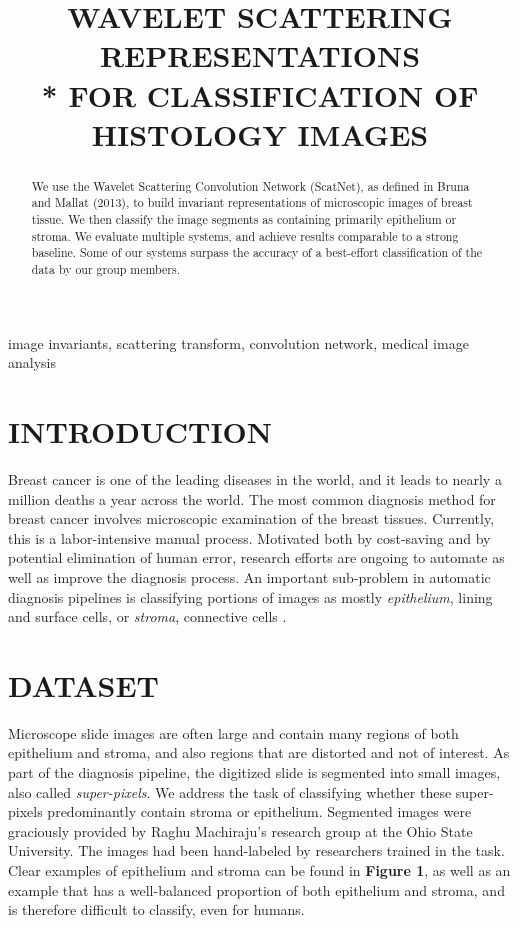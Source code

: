 \documentclass{article}
\title{WAVELET SCATTERING REPRESENTATIONS \\*
FOR CLASSIFICATION OF HISTOLOGY IMAGES}
\begin{document}
%
\maketitle
%
\begin{abstract}
We use the Wavelet Scattering Convolution Network (ScatNet), as defined in Bruna
and Mallat (2013), to build invariant representations of microscopic images of breast
tissue. We then classify the image segments as containing primarily epithelium or stroma.
We evaluate multiple systems, and achieve results comparable to a strong baseline. Some
of our systems surpass the accuracy of a best-effort classification of the data by our
group members.
\end{abstract}
%
\begin{keywords}
image invariants, scattering transform, convolution network, medical image analysis
\end{keywords}
%
\section{INTRODUCTION}
\label{sec:intro}

Breast cancer is one of the leading diseases in the world, and it leads to nearly a
million deaths a year across the world. The most common diagnosis method for breast
cancer involves microscopic examination of the breast tissues. Currently, this is a
labor-intensive manual process. Motivated both by cost-saving and by potential
elimination of human error, research efforts are ongoing to automate as well as improve
the diagnosis process. An important sub-problem in automatic diagnosis pipelines is
classifying portions of images as mostly \emph{epithelium}, lining and surface cells,
or \emph{stroma}, connective cells \cite{Beck2011}.

\section{DATASET}
\label{sec:data}

Microscope slide images are often large and contain many regions of both epithelium
and stroma, and also regions that are distorted and not of interest. As part of the
diagnosis pipeline, the digitized slide is segmented into small images, also called
\emph{super-pixels}. We address the task of classifying whether these super-pixels
predominantly contain stroma or epithelium. Segmented images were graciously provided
by Raghu Machiraju’s research group at the Ohio State University. The images had been
hand-labeled by researchers trained in the task. Clear examples of epithelium and
stroma can be found in \textbf{Figure 1}, as well as an example that has a well-balanced
proportion of both epithelium and stroma, and is therefore difficult to classify,
even for humans.
\end{document}

